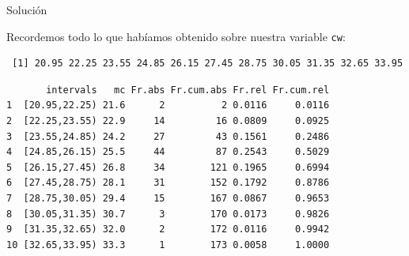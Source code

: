 \documentclass[
  ignorenonframetext,
]{beamer}
\begin{document}
\begin{frame}[fragile]{Solución}
\protect\hypertarget{soluciuxf3n-30}{}

Recordemos todo lo que habíamos obtenido sobre nuestra variable
\texttt{cw}:

\begin{verbatim}
 [1] 20.95 22.25 23.55 24.85 26.15 27.45 28.75 30.05 31.35 32.65 33.95
\end{verbatim}

\begin{verbatim}
       intervals   mc Fr.abs Fr.cum.abs Fr.rel Fr.cum.rel
1  [20.95,22.25) 21.6      2          2 0.0116     0.0116
2  [22.25,23.55) 22.9     14         16 0.0809     0.0925
3  [23.55,24.85) 24.2     27         43 0.1561     0.2486
4  [24.85,26.15) 25.5     44         87 0.2543     0.5029
5  [26.15,27.45) 26.8     34        121 0.1965     0.6994
6  [27.45,28.75) 28.1     31        152 0.1792     0.8786
7  [28.75,30.05) 29.4     15        167 0.0867     0.9653
8  [30.05,31.35) 30.7      3        170 0.0173     0.9826
9  [31.35,32.65) 32.0      2        172 0.0116     0.9942
10 [32.65,33.95) 33.3      1        173 0.0058     1.0000
\end{verbatim}

\end{frame}
\end{document}
